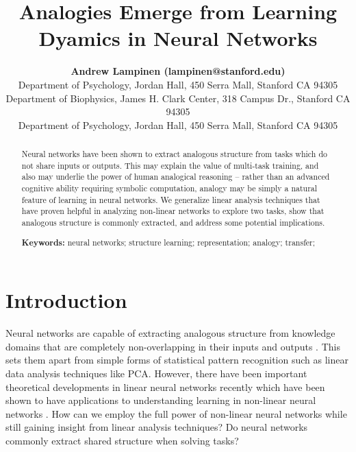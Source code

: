 \documentclass[10pt,letterpaper]{article}
\title{Analogies Emerge from Learning Dyamics in Neural Networks}
\author{{\large \bf Andrew Lampinen (lampinen@stanford.edu)} \\
  Department of Psychology, Jordan Hall, 450 Serra Mall, Stanford CA 94305 
  \AND {\large \bf Shaw Hsu (cshawhsu@stanford.edu)} \\
  Department of Biophysics, James H. Clark Center, 318 Campus Dr., Stanford CA 94305
  \AND {\large \bf James L. McClelland (mcclelland@stanford.edu)} \\
  Department of Psychology, Jordan Hall, 450 Serra Mall, Stanford CA 94305}
\begin{document}
\maketitle


\begin{abstract}
Neural networks have been shown to extract analogous structure from tasks which do not share inputs or outputs. This may explain the value of multi-task training, and also may underlie the power of human analogical reasoning -- rather than an advanced cognitive ability requiring symbolic computation, analogy may be simply a natural feature of learning in neural networks. We generalize linear analysis techniques that have proven helpful in analyzing non-linear networks to explore two tasks, show that analogous structure is commonly extracted, and address some potential implications. 

\textbf{Keywords:} 
neural networks; structure learning; representation; analogy; transfer; 
\end{abstract}


\section{Introduction}
Neural networks are capable of extracting analogous structure from knowledge domains that are completely non-overlapping in their inputs and outputs \citep{Hinton1986,Rogers2008}. This sets them apart from simple forms of statistical pattern recognition \citep{Rogers2008} such as linear data analysis techniques like PCA. However, there have been important theoretical developments in linear neural networks recently which have been shown to have applications to understanding learning in non-linear neural networks \citep{Saxe2013}. How can we employ the full power of non-linear neural networks while still gaining insight from linear analysis techniques? Do neural networks commonly extract shared structure when solving tasks?\par 
\end{document}

